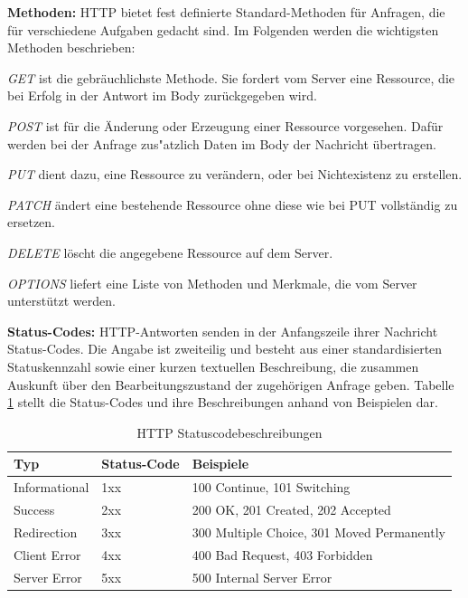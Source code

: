 \noindent
{}
\textbf{Methoden:}
HTTP bietet fest definierte Standard-Methoden für Anfragen, die für verschiedene Aufgaben gedacht sind. Im Folgenden werden die wichtigsten Methoden beschrieben:
\begin{itemize}
{\setlength\itemindent{1cm}\item\textit{GET} ist die gebräuchlichste Methode. Sie fordert vom Server eine Ressource, die bei Erfolg in der Antwort im Body zurückgegeben wird.}
		
		\item \textit{POST} ist für die Änderung oder Erzeugung einer Ressource vorgesehen. Dafür werden bei der Anfrage zus"atzlich Daten im Body der Nachricht übertragen.
		
		\item \textit{PUT} dient dazu, eine Ressource zu verändern, oder bei Nichtexistenz zu erstellen.
	
		\item \textit{PATCH} ändert eine bestehende Ressource ohne diese wie bei PUT vollständig zu ersetzen. 
		
		\item \textit{DELETE} löscht die angegebene Ressource auf dem Server.
		
		\item \textit{OPTIONS} liefert eine Liste von Methoden und Merkmale, die vom Server unterstützt werden.
		
\end{itemize}
\newpage
\noindent
{}
\textbf{Status-Codes:}
HTTP-Antworten senden in der Anfangszeile ihrer Nachricht Status-Codes. Die Angabe ist zweiteilig und besteht aus einer standardisierten Statuskennzahl sowie einer kurzen textuellen Beschreibung, die zusammen Auskunft über den Bearbeitungszustand der zugehörigen Anfrage geben. Tabelle \ref{tab:HTTPStatuscode} stellt die Status-Codes und ihre Beschreibungen anhand von Beispielen dar. \newline

\begin{table}[tbt]
\caption{HTTP Statuscodebeschreibungen}
\label{tab:HTTPStatuscode}
\begin{center}
    \begin{tabular}{ l  l   p{8cm} }
    \toprule
    Typ & Status-Code & Beispiele \\
    \midrule
    
    Informational & 1xx & 100 Continue, 101 Switching\\

    Success & 2xx & 200 OK, 201 Created, 202 Accepted  \\

	Redirection & 3xx & 300 Multiple Choice, 301 Moved Permanently  \\

    Client Error & 4xx & 400 Bad Request, 403 Forbidden\\ 

    Server Error & 5xx & 500 Internal Server Error \\
    \bottomrule
    \end{tabular}
\end{center}
\end{table}

